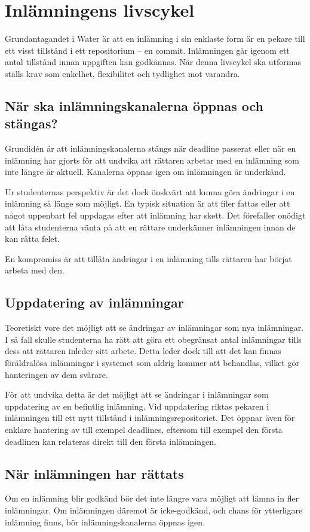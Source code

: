 \section{Inlämningens livscykel}

Grundantagandet i Water är att en inlämning i sin enklaste form är en pekare till ett visst tillstånd i ett repositorium – en commit. Inlämningen går igenom ett antal tillstånd innan uppgiften kan godkännas. När denna livscykel ska utformas ställs krav som enkelhet, flexibilitet och tydlighet mot varandra.

\subsection{När ska inlämningskanalerna öppnas och stängas?}
Grundidén är att inlämningskanalerna stängs när deadline passerat eller när en inlämning har gjorts för att undvika att rättaren arbetar med en inlämning som inte längre är aktuell. Kanalerna öppnas igen om inlämningen är underkänd.

Ur studenternas perspektiv är det dock önskvärt att kunna göra ändringar i en inlämning så länge som möjligt. En typisk situation är att filer fattas eller att något uppenbart fel uppdagas efter att inlämning har skett. Det förefaller onödigt att låta studenterna vänta på att en rättare underkänner inlämningen innan de kan rätta felet.

En kompromiss är att tillåta ändringar i en inlämning tills rättaren har börjat arbeta med den. 

\subsection{Uppdatering av inlämningar}
Teoretiskt vore det möjligt att se ändringar av inlämningar som nya inlämningar. I så fall skulle studenterna ha rätt att göra ett obegränsat antal inlämningar tills dess att rättaren inleder sitt arbete. Detta leder dock till att det kan finnas föräldralösa inlämningar i systemet som aldrig kommer att behandlas, vilket gör hanteringen av dem svårare.

För att undvika detta är det möjligt att se ändringar i inlämningar som uppdatering av en befintlig inlämning. Vid uppdatering riktas pekaren i inlämningen till ett nytt tillstånd i inlämningsrepositoriet. Det öppnar även för enklare hantering av till exempel deadlines, eftersom till exempel den första deadlinen kan relateras direkt till den första inlämningen.

\subsection{När inlämningen har rättats}
Om en inlämning blir godkänd bör det inte längre vara möjligt att lämna in fler inlämningar. Om inlämningen däremot är icke-godkänd, och chans för ytterligare inlämning finns, bör inlämningskanalerna öppnas igen.

